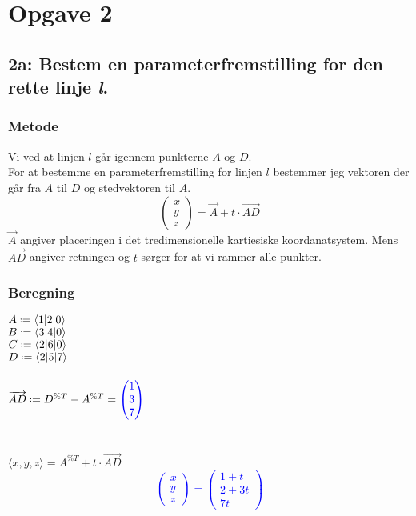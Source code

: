 \documentclass[../main.tex]{subfiles}
\begin{document}
\section*{Opgave 2}
\subsection*{2a: Bestem en parameterfremstilling for den rette linje \textit{l}.}
    \subsubsection*{Metode}
        Vi ved at linjen \(l\) går igennem punkterne \(A\) og \(D\).\\
        For at bestemme en parameterfremstilling for linjen \(l\) bestemmer jeg vektoren der går fra \(A\) til \(D\) og stedvektoren til \(A\).\\
        \[\begin{pmatrix} x\\y\\z \end{pmatrix}=\overrightarrow{A}+t\cdot \overrightarrow{AD}\]
        \(\overrightarrow{A}\) angiver placeringen i det tredimensionelle kartiesiske koordanatsystem. Mens \(\overrightarrow{AD}\) angiver retningen og \(t\) sørger for at vi rammer alle punkter.
    \subsubsection*{Beregning}
        \(A \defeq \langle 1{\vert 2\vert}0 \rangle\)\\
        \(B \defeq \langle 3{\vert 4\vert}0 \rangle\)\\
        \(C \defeq \langle 2{\vert 6\vert}0\rangle\)\\
        \(D \defeq \langle 2{\vert 5\vert}7 \rangle\)\\\\
        \(\overrightarrow{AD} \defeq D^{\%T} - A^{\%T}= \textcolor{blue}{\begin{pmatrix} 1\\ 3\\7 \end{pmatrix}}\)\\\\\\
        \(\langle x, y, z \rangle = A^{\%T}+ t\cdot \overrightarrow{AD}\)
        \textcolor{blue}{\[\begin{pmatrix} x \\ y\\ z\end{pmatrix}=\begin{pmatrix} 1+t \\ 2+3t\\ 7t\end{pmatrix}\]}
\end{document}
